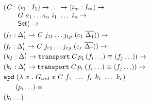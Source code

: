 \documentclass[runningheads]{llncs}
\begin{document}
\begin{figure}[t]
\begin{minipage}{.5\textwidth}
\begin{align*}
& \begin{array}{@{}l@{}l}(\mathit{C} :\ & (i_1 : I_1) \to \ldots \to (i_m : I_m) \to\\  & G\ a_1 \ldots a_n\ i_1\ \ldots\ i_n \to\\ &\SET{})\to\end{array} \\
& (\mathit{f_1} : \Delta_1^\prime \to \mathit{C}\ j_{11} \ldots j_{1p}\ (c_1\ \overline{\Delta_1})) \to \\
& (\mathit{f_r} : \Delta_r^\prime \to \mathit{C}\ j_{r1} \ldots j_{rp}\ (c_r\ \overline{\Delta_r})) \to \\
& (\mathit{k_1} : \Delta_1^\prime \to \texttt{transport} \, \mathit{C} \, p_1 \, (f_i \ldots) \equiv (f_j \ldots)) \to \\
& (\mathit{k_r} : \Delta_r^\prime \to \texttt{transport} \, \mathit{C} \, p_r \, (f_i \ldots) \equiv (f_j \ldots)) \to \\
& \texttt{apd} \  (\lambda \  x\ .\ G_{ind} \  x \  C \  f_1 \ \ldots\ f_r \  k_1 \ \ldots\ k_r)\\
&\hspace{0.5cm} \  (p_i \ldots) \equiv\\
& (k_i \ldots)
\end{align*}
{}
\label{fig:BGind}
\end{minipage}
\end{figure}
\end{document}
